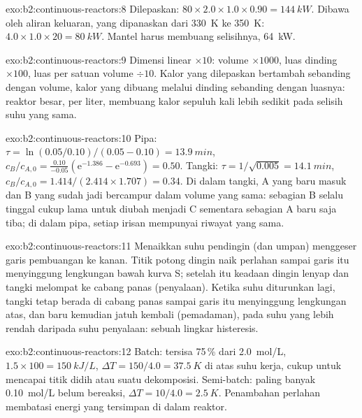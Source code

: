 \begin{solution}{exo:b2:continuous-reactors:8}
Dilepaskan: $80 \times 2.0 \times 1.0 \times 0.90 = \qty{144}{kW}$. Dibawa
oleh aliran keluaran, yang dipanaskan dari \qty{330}{K} ke \qty{350}{K}:
$4.0 \times 1.0 \times 20 =
\qty{80}{kW}$. Mantel harus membuang
selisihnya, \qty{64}{kW}.
\end{solution}

\begin{solution}{exo:b2:continuous-reactors:9}
Dimensi linear $\times 10$: volume $\times 1000$, luas dinding
$\times 100$, luas per satuan volume $\div 10$. Kalor yang dilepaskan
bertambah sebanding dengan volume, kalor yang dibuang melalui dinding
sebanding dengan luasnya: reaktor besar, per liter, membuang kalor sepuluh
kali lebih sedikit pada selisih suhu yang sama.
\end{solution}

\begin{solution}{exo:b2:continuous-reactors:10}
Pipa: $\tau = \ln(0.05/0.10)/(0.05 - 0.10) = \qty{13.9}{min}$, $c_B/c_{A,0} =
\frac{0.10}{-0.05}(\mathrm e^{-1.386} - \mathrm e^{-0.693}) = 0.50$. Tangki: $\tau =
1/\sqrt{0.005} = \qty{14.1}{min}$, $c_B/c_{A,0} = 1.414/(2.414 \times 1.707) =
0.34$. Di dalam tangki, A yang baru masuk dan B yang sudah jadi bercampur
dalam volume yang sama: sebagian B selalu tinggal cukup lama untuk diubah
menjadi C sementara sebagian A baru saja tiba; di dalam pipa, setiap
irisan mempunyai riwayat yang sama.
\end{solution}

\begin{solution}{exo:b2:continuous-reactors:11}
Menaikkan suhu pendingin (dan umpan) menggeser garis pembuangan ke kanan.
Titik potong dingin naik perlahan sampai garis itu menyinggung lengkungan
bawah kurva S; setelah itu keadaan dingin lenyap dan tangki melompat ke
cabang panas (penyalaan). Ketika suhu diturunkan lagi, tangki tetap
berada di cabang panas sampai garis itu menyinggung lengkungan atas, dan
baru kemudian jatuh kembali (pemadaman), pada suhu yang lebih rendah
daripada suhu penyalaan: sebuah lingkar histeresis.
\end{solution}

\begin{solution}{exo:b2:continuous-reactors:12}
Batch: tersisa 75\,\% dari \qty{2.0}{mol/L}, $1.5 \times 100 = \qty{150}{kJ/L}$, $\Delta T = 150/4.0 = \qty{37.5}{K}$ di atas suhu kerja,
cukup untuk mencapai titik didih atau suatu dekomposisi. Semi-batch:
paling banyak \qty{0.10}{mol/L} belum bereaksi, $\Delta T = 10/4.0 = \qty{2.5}{K}$. Penambahan perlahan membatasi energi yang tersimpan di
dalam reaktor.
\end{solution}

